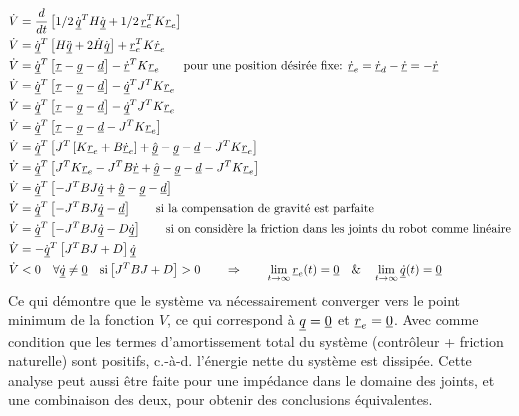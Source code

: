 \begin{align}
	\dot{V} &= \frac{d}{dt} \left[ 1/2 \,  \dot{\col{q}}^T H \dot{\col{q}}  + 1/2 \, \col{r}_e^T K \col{r}_e \right]  \\
	\dot{V} &= \dot{\col{q}}^T
	\left[
		H \ddot{\col{q}} + 2 \dot{H} \dot{\col{q}}
		\right] +
	\col{r}_e^T K \col{\dot{r}}_e
	\\%
	\dot{V} &= \dot{\col{q}}^T
	\left[
		\col{\tau} - \col{g} - \col{d}
		\right] -
	\col{\dot{r}}^T K \col{r}_e
	\quad \quad
	\text{pour une position désirée fixe: }  \col{\dot{r}}_e = \col{\dot{r}}_d - \col{\dot{r}} = - \col{\dot{r}}
	\\%
	\dot{V} &= \dot{\col{q}}^T
	\left[
		\col{\tau} - \col{g} - \col{d}
		\right] -
	\col{\dot{q}}^T J^T K \col{r}_e
	\\%
	\dot{V} &= \dot{\col{q}}^T
	\left[
		\col{\tau} - \col{g} - \col{d}
		\right] -
	\col{\dot{q}}^T J^T K \col{r}_e
	\\%
	\dot{V} &= \dot{\col{q}}^T
	\left[
		\col{\tau} - \col{g} - \col{d}
		- J^T K \col{r}_e
		\right]
	\\%
	\dot{V} &= \dot{\col{q}}^T
	\left[
		J^T   \left[ K \col{r}_e + B \col{\dot{r}}_e \right] + \col{\hat{g}}
		- \col{g} - \col{d}
		- J^T K \col{r}_e
		\right]
	\\%
	\dot{V} &= \dot{\col{q}}^T
	\left[
		J^T  K \col{r}_e
		- J^T B \col{\dot{r}}
		+ \col{\hat{g}}
		- \col{g} - \col{d}
		- J^T K \col{r}_e
		\right]
	\\%
	\dot{V} &= \dot{\col{q}}^T
	\left[
		- J^T B J \col{\dot{q}}
		+ \col{\hat{g}}
		- \col{g} - \col{d}
		\right]
	\\%
	\dot{V} &= \dot{\col{q}}^T
	\left[
		- J^T B J \col{\dot{q}} - \col{d}
		\right]
	\quad \quad
	\text{si la compensation de gravité est parfaite}
	\\%
	\dot{V} &= \dot{\col{q}}^T
	\left[
		- J^T B J \col{\dot{q}} - D \col{\dot{q}}
		\right]
	\quad \quad
	\text{si on considère la friction dans les joints du robot comme linéaire}
	\\%
	\dot{V} &= - \dot{\col{q}}^T
	\left[
		J^T B J + D
		\right] \col{\dot{q}}
	\\%
	\dot{V} &< 0 \quad
	\forall \col{\dot{q}} \neq \col{0} \quad
	\text{si} \left[ J^T B J + D \right]  > 0
	\quad\quad \Rightarrow \quad\quad
	\lim_{t \rightarrow \infty} \col{r}_e(t) = \col{0} \quad \& \quad
	\lim_{t \rightarrow \infty} \col{\dot{q}}(t) = \col{0}
\end{align}
Ce qui démontre que le système va nécessairement converger vers le point minimum de la fonction $V$, ce qui correspond à $\underline{q} = \underline{0}$ et $\underline{r}_e = \underline{0}$. Avec comme condition que les termes d'amortissement total du système (contrôleur + friction naturelle) sont positifs, c.-à-d. l'énergie nette du système est dissipée. Cette analyse peut aussi être faite pour une impédance dans le domaine des joints, et une combinaison des deux, pour obtenir des conclusions équivalentes.

